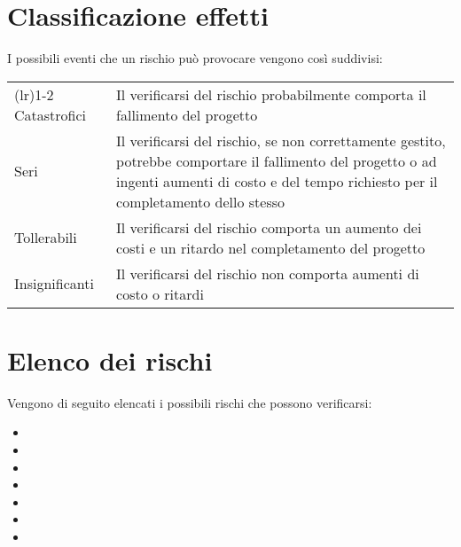 \section{Classificazione effetti}
I possibili eventi che un rischio può provocare vengono così suddivisi:
\begin{center}
	\begin{tabularx}{\widthTab}{ l  X } 
		\toprule
			\formattaTitoloTab{Classificazione} & \formattaTitoloTab{Effetti} \\
		\cmidrule(l{\cmidrulekern}r{\cmidrulekern}){1-2}
			Catastrofici & Il verificarsi del rischio probabilmente comporta il fallimento del progetto \\ 
			\addlinespace[1em] 
			Seri & Il verificarsi del rischio, se non correttamente gestito, potrebbe comportare il fallimento del progetto o ad ingenti aumenti di costo e del tempo richiesto per il completamento dello stesso \\ 
			\addlinespace[1em] 
			Tollerabili & Il verificarsi del rischio comporta un aumento dei costi e un ritardo nel completamento del progetto  \\ 
			\addlinespace[1em] 
			Insignificanti & Il verificarsi del rischio non comporta aumenti di costo o ritardi \\
		\bottomrule
	\end{tabularx}
\end{center}

\section{Elenco dei rischi}
Vengono di seguito elencati i possibili rischi che possono verificarsi:
\begin{itemize}
	\item {}
	\item {}
	\item {}
	\item {}
	\item {}
	\item {}
	\item {}
\end{itemize}

